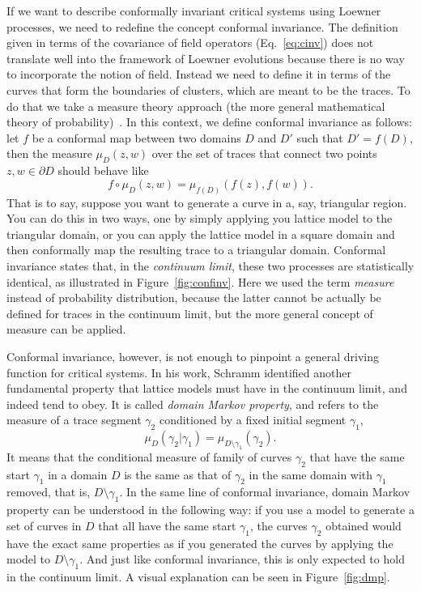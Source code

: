 If we want to describe conformally invariant critical systems using Loewner
processes, we need to redefine the concept conformal invariance. The definition
given in terms of the covariance of field operators (Eq.~\ref{eq:cinv}) does
not translate well into the framework of Loewner evolutions because there is no
way to incorporate the notion of field. Instead we need to define it in terms
of the curves that form the boundaries of clusters, which are meant to be the
traces. To do that we take a measure theory approach (the more general
mathematical theory of probability)~\cite{Ash2000}. In this context, we define
conformal invariance as follows: let $f$ be a conformal map between two domains
$D$ and $D'$ such that $D'=f(D)$, then the measure $\mu_D(z, w)$ over the set
of traces that connect two points $z,w\in\partial D$ should behave
like~\cite{Cardy2005}
\begin{equation}
    \newcommand{\pp}[1]{\left(#1\right)}
    f\circ\mu_D\pp{z,w} = \mu_{f(D)}\pp{f\pp{z}, f\pp{w}}.
\end{equation}
That is to say, suppose you want to generate a curve in a, say, triangular
region. You can do this in two ways, one by simply applying you lattice model
to the triangular domain, or you can apply the lattice model in a square domain
and then conformally map the resulting trace to a triangular domain. Conformal
invariance states that, in the \textit{continuum limit}, these two processes
are statistically identical, as illustrated in Figure~\ref{fig:confinv}. Here
we used the term \textit{measure} instead of probability distribution, because
the latter cannot be actually be defined for traces in the continuum limit, but
the more general concept of measure can be applied.

Conformal invariance, however, is not enough to pinpoint a general driving
function for critical systems. In his work, Schramm identified another
fundamental property that lattice models must have in the continuum limit, and
indeed tend to obey. It is called \textit{domain Markov property}, and refers
to the measure of a trace segment $\gamma_2$ conditioned by a
fixed initial segment $\gamma_1$,
\begin{equation}
    \newcommand{\pp}[1]{\left(#1\right)}
    \mu_D\pp{\gamma_2|\gamma_1} = \mu_{D\setminus\gamma_1}\pp{\gamma_2}.
\end{equation}
It means that the conditional measure of family of curves $\gamma_2$ that have the
same start $\gamma_1$ in a domain $D$ is the same as that of $\gamma_2$ in
the same domain with $\gamma_1$ removed, that is, $D\setminus\gamma_1$.
In the same line of conformal invariance, domain Markov property can be
understood in the following way: if you use a model to generate a set of curves
in $D$ that all have the same start $\gamma_1$, the curves $\gamma_2$ obtained
would have the exact same properties as if you generated the curves by applying
the model to $D\setminus\gamma_1$. And just like conformal invariance, this is
only expected to hold in the continuum limit. A visual explanation can be seen
in Figure~\ref{fig:dmp}.


